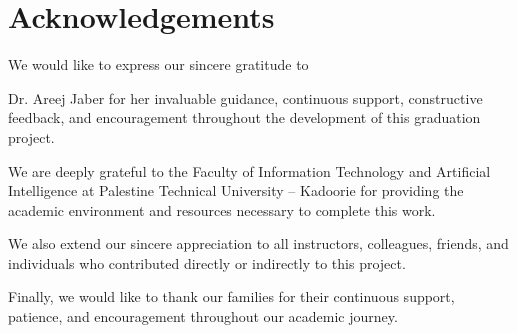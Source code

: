 \documentclass[12pt,a4paper,oneside]{report}
\newcommand{\SupervisorName}{
Dr. Areej Jaber
}
\begin{document}
\clearpage


\chapter*{Acknowledgements}


We would like to express our sincere gratitude to
\SupervisorName{} for her invaluable guidance, continuous support,
constructive feedback, and encouragement throughout the development
of this graduation project.

We are deeply grateful to the Faculty of Information Technology and
Artificial Intelligence at Palestine Technical University -- Kadoorie
for providing the academic environment and resources necessary to
complete this work.

We also extend our sincere appreciation to all instructors,
colleagues, friends, and individuals who contributed directly or
indirectly to this project.

Finally, we would like to thank our families for their continuous
support, patience, and encouragement throughout our academic journey.

\clearpage


\tableofcontents

\clearpage


\listoffigures


\clearpage


\listoftables


\clearpage

\end{document}
